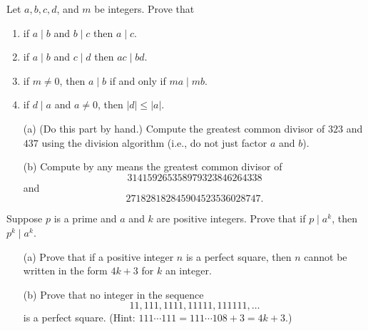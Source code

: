 \documentclass{exam}
\begin{document}
\begin{questions}

	\question[15] Let $a,b,c,d$, and $m$ be integers.  Prove that
		\begin{enumerate}
			\item if $a\mid b$ and $b\mid c$ then $a\mid c$. %
			\item if $a\mid b$ and $c\mid d$ then $ac\mid bd$.
			\item if $m\neq 0$, then $a\mid b$ if and only if $ma\mid mb$.
			\item if $d\mid a$ and $a\neq 0$, then $|d|\leq |a|$.
		\end{enumerate}


	\question[5] 
		\begin{enumerate} 
			\item[(a)] (Do this part by hand.) Compute the greatest common divisor of $323$ and $437$ using the division algorithm (i.e., do not just factor $a$ and $b$).
			\item[(b)] Compute by any means the greatest common divisor of
			$$314159265358979323846264338$$ 
			and 
			$$271828182845904523536028747.$$
		\end{enumerate}

	\question[10] Suppose $p$ is a prime and $a$ and $k$ are positive integers.  Prove that if $p \mid a^k$, then $p^k \mid a^k$.

	\question[10]
		\begin{enumerate}
			\item[(a)]  Prove that if a positive integer $n$ is a perfect square, then $n$ cannot be written in the form $4k+3$ for $k$ an integer.
			\item[(b)]  Prove that no integer in the sequence
			$$
			  11, 111, 1111, 11111, 111111, \ldots
			$$
			is a perfect square.   (Hint: $111\cdots111 = 111\cdots 108 + 3 = 4k+3$.)
		\end{enumerate}


\end{questions}
\end{document}
